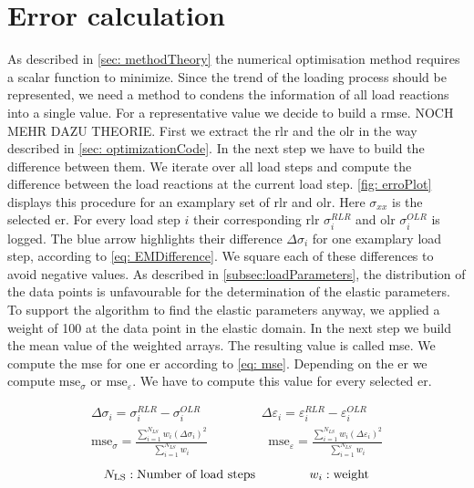 \section{Error calculation}\label{sec: errorCalculation}
As described in \autoref{sec: methodTheory} the numerical optimisation method requires a scalar function to minimize. 
Since the trend of the loading process should be represented, we need a method to condens the information of all load reactions into a single value.  For a representative value we decide to build a \acrfull{rmse}. NOCH MEHR DAZU THEORIE.
First we extract the \acrshort{rlr} and the \acrshort{olr} in the way described in \autoref{sec: optimizationCode}. In the next step we have to build the difference between them. We iterate over all load steps and compute the difference between the load reactions at the current load step. \autoref{fig: erroPlot} displays this procedure for an examplary set of \acrshort{rlr} and \acrshort{olr}. Here $\sigma_{xx}$ is the selected \acrlong{er}. For every load step $i$ their corresponding \acrshort{rlr} $\sigma_{i}^{\scriptscriptstyle RLR}$ and \acrshort{olr} $\sigma_{i}^{\scriptscriptstyle OLR}$ is logged. The blue arrow highlights their difference $\Delta\sigma_{i}$ for one examplary load step, according to \autoref{eq: EMDifference}. We square each of these differences to avoid negative values.  As described in \autoref{subsec:loadParameters}, the distribution of the data points is unfavourable for the determination of the elastic parameters. To support the algorithm to find the elastic parameters anyway, we applied a weight of 100 at the data point in the elastic domain. In the next step we build the mean value of the weighted arrays. The resulting value is called \acrfull{mse}. We compute the \acrshort{mse} for one \acrlong{er} according to \autoref{eq: mse}. Depending on the \acrlong{er} we compute $\text{mse}_{\sigma}$ or $\text{mse}_{\varepsilon}$. We have to compute this value for every selected \acrlong{er}. 



\begin{center}
    \begin{gather}
        \label{eq: EMDifference}
        \Delta\sigma_{i} = \sigma_{i}^{\scriptscriptstyle RLR} - \sigma_{i}^{\scriptscriptstyle OLR} \hspace{2cm}
        \Delta\varepsilon_{i} = \varepsilon_{i}^{\scriptscriptstyle RLR} - \varepsilon_{i}^{\scriptscriptstyle OLR}\\
        \label{eq: mse}
        \text{mse}_{\sigma} = \frac{\displaystyle\sum_{i=1}^{N_{LS}} w_i (\Delta\sigma_{i})^2}{\displaystyle\sum_{i=1}^{N_{LS}}w_i } \hspace{2cm}
        \text{mse}_{\varepsilon} = \frac{\displaystyle\sum_{i=1}^{N_{LS}} w_i (\Delta\varepsilon_{i})^2}{\displaystyle\sum_{i=1}^{N_{LS}}w_i }
    \end{gather}
    \begin{equation*}
        N_{\text{LS}}: \text{Number of load steps}
        \hspace{1.5cm}
        w_i : \text{weight}
    \end{equation*}
\end{center}



